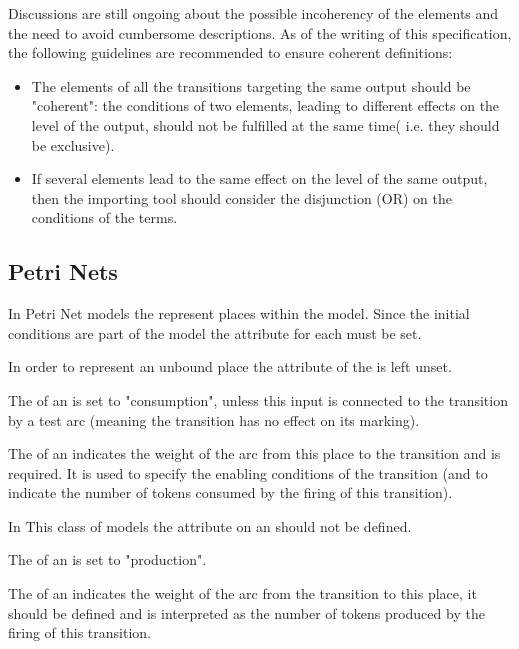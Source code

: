 Discussions are still ongoing about the possible incoherency of the  elements and the need to avoid cumbersome descriptions. As of the writing of this specification, the following guidelines are recommended to ensure coherent definitions:
\begin{itemize}
\item The  elements of all the transitions targeting the same output should be "coherent": the conditions of two  elements, leading to different effects on the level of the output, should not be fulfilled at the same time( i.e. they should be exclusive).
\item If several  elements lead to the same effect on the level of the same output, then the importing tool should consider the disjunction (OR) on the conditions of the terms. 
\end{itemize}
 
\subsection{Petri Nets}

In Petri Net models the \QualitativeSpecies represent places within the model. Since the initial conditions are part of the model the  attribute for each \QualitativeSpecies must be set.

In order to represent an unbound place the  attribute of the \QualitativeSpecies is left unset.

The  of an  is set to "consumption", unless this input is connected to the transition by a test arc (meaning the transition has no effect on its marking). 

The  of an \Input indicates the weight of the arc from this place to the transition and is required. It is used to specify the enabling conditions of the transition (and to indicate the number of tokens consumed by the firing of this transition). 

In This class of models the  attribute on an \Input should not be defined.

The  of an  is set to "production". 

The  of an \Output indicates the weight of the arc from the transition to this place, it should be defined and is interpreted as  the number of tokens produced by the firing of this transition.




